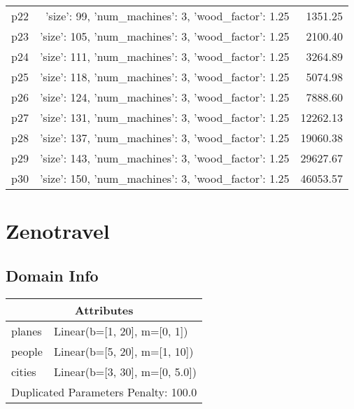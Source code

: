 \documentclass{article}
\begin{document}
\begin{center}
\begin{tabular}{@{}l|r|r@{}}
  p22&{'size': 99, 'num\_machines': 3, 'wood\_factor': 1.25}&1351.25\\
  p23&{'size': 105, 'num\_machines': 3, 'wood\_factor': 1.25}&2100.40\\
  p24&{'size': 111, 'num\_machines': 3, 'wood\_factor': 1.25}&3264.89\\
  p25&{'size': 118, 'num\_machines': 3, 'wood\_factor': 1.25}&5074.98\\
  p26&{'size': 124, 'num\_machines': 3, 'wood\_factor': 1.25}&7888.60\\
  p27&{'size': 131, 'num\_machines': 3, 'wood\_factor': 1.25}&12262.13\\
  p28&{'size': 137, 'num\_machines': 3, 'wood\_factor': 1.25}&19060.38\\
  p29&{'size': 143, 'num\_machines': 3, 'wood\_factor': 1.25}&29627.67\\
  p30&{'size': 150, 'num\_machines': 3, 'wood\_factor': 1.25}&46053.57
                            \end{tabular}
                            \end{center}
                    
                            \newpage \section{Zenotravel}
                    \subsection*{Domain Info}

                    \begin{center}
                    \begin{tabular}{@{}p{}p{}@{}}
                    \multicolumn{2}{c}{\bf \large Attributes}\\\midrule
                    planes & Linear(b=[1, 20], m=[0, 1])\\
people & Linear(b=[5, 20], m=[1, 10])\\
cities & Linear(b=[3, 30], m=[0, 5.0])
                    
                     \\\midrule
                    \multicolumn{2}{l}{Duplicated Parameters Penalty: 100.0}
                    \end{tabular}
                    \end{center}
                
\end{document}
